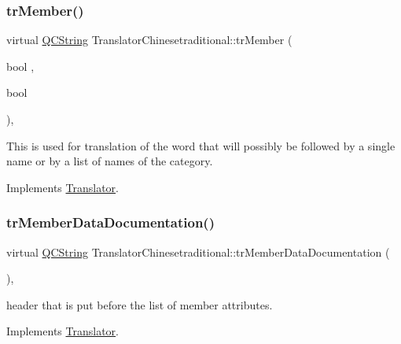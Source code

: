 \subsubsection{\texorpdfstring{trMember()}{trMember()}}
{\footnotesize\ttfamily virtual \mbox{\hyperlink{class_q_c_string}{Q\+C\+String}} Translator\+Chinesetraditional\+::tr\+Member (\begin{DoxyParamCaption}\item[{bool}]{,  }\item[{bool}]{ }\end{DoxyParamCaption})\hspace{0.3cm}{\ttfamily [inline]}, {\ttfamily [virtual]}}

This is used for translation of the word that will possibly be followed by a single name or by a list of names of the category. 

Implements \mbox{\hyperlink{class_translator}{Translator}}.

\mbox{\label{class_translator_chinesetraditional_a61381745fb939687e8a569ec137cc60c}} 
\subsubsection{\texorpdfstring{trMemberDataDocumentation()}{trMemberDataDocumentation()}}
{\footnotesize\ttfamily virtual \mbox{\hyperlink{class_q_c_string}{Q\+C\+String}} Translator\+Chinesetraditional\+::tr\+Member\+Data\+Documentation (\begin{DoxyParamCaption}{ }\end{DoxyParamCaption})\hspace{0.3cm}{\ttfamily [inline]}, {\ttfamily [virtual]}}

header that is put before the list of member attributes. 

Implements \mbox{\hyperlink{class_translator}{Translator}}.

\mbox{\label{class_translator_chinesetraditional_ac3b40e07275582cfee780a2d5b448e37}} 
